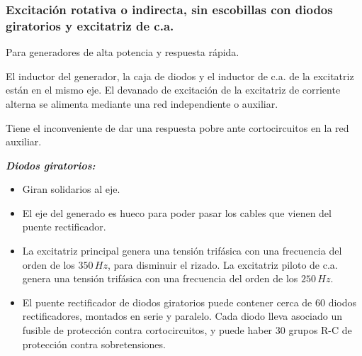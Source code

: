		\newpage
		\subsubsection{Excitación rotativa o indirecta, sin escobillas con diodos giratorios y excitatriz de c.a.}
			Para generadores de alta potencia y respuesta rápida.
			
			
			El inductor del generador, la caja de diodos y el inductor de c.a. de la excitatriz están en el mismo eje. El devanado de excitación de la excitatriz de corriente alterna se alimenta mediante una red independiente o auxiliar.
			
			
			Tiene el inconveniente de dar una respuesta pobre ante cortocircuitos en la red auxiliar.
			
			\vspace{0.25cm}
			\textbf{\textit{Diodos giratorios:}}
			\begin{itemize}
				\item Giran solidarios al eje.
				\item El eje del generado es hueco para poder pasar los cables que vienen del puente rectificador.
				\item La excitatriz principal genera una tensión trifásica con una frecuencia del orden de los $350\,Hz$, para disminuir el rizado. La excitatriz piloto de c.a. genera una tensión trifásica con una frecuencia del orden de los $250\,Hz$.
				\item El puente rectificador de diodos giratorios puede contener cerca de 60 diodos rectificadores, montados en serie y paralelo. Cada diodo lleva asociado un fusible de protección contra cortocircuitos, y puede haber 30 grupos R-C de protección contra sobretensiones.
			\end{itemize}
			
